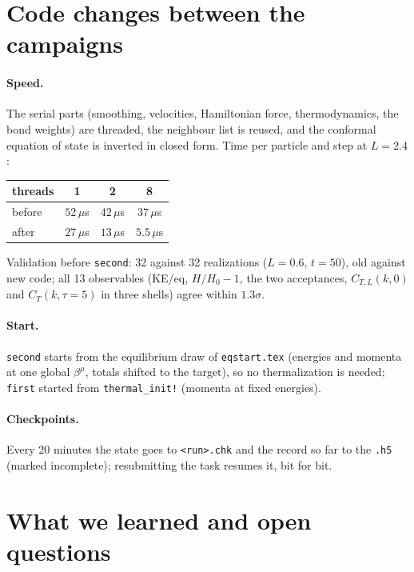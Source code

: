 \documentclass[11pt,aps,preprint,nofootinbib,superscriptaddress,tightenlines]{revtex4-2}
\let\oldparagraph\paragraph
\renewcommand{\paragraph}{\par\bigskip\oldparagraph}
\begin{document}
\section{Code changes between the campaigns}
\label{sec:code}

\paragraph{Speed.}  The serial parts (smoothing, velocities, Hamiltonian force,
thermodynamics, the bond weights) are threaded, the neighbour list is reused, and the
conformal equation of state is inverted in closed form.  Time per particle and step at
$L=2.4$:
\begin{center}
\begin{tabular}{lccc}
\hline
threads & 1 & 2 & 8 \\ \hline
before & $52\,\mu$s & $42\,\mu$s & $37\,\mu$s \\
after & $27\,\mu$s & $13\,\mu$s & $5.5\,\mu$s \\
\hline
\end{tabular}
\end{center}
Validation before \texttt{second}: 32 against 32 realizations ($L=0.6$, $t=50$), old against
new code; all 13 observables (KE/eq, $H/H_0-1$, the two acceptances, $C_{T,L}(k,0)$ and
$C_T(k,\tau=5)$ in three shells) agree within $1.3\sigma$.

\paragraph{Start.}  \texttt{second} starts from the equilibrium draw of
\texttt{eqstart.tex} (energies and momenta at one global $\beta^\mu$, totals shifted to the
target), so no thermalization is needed; \texttt{first} started from
\texttt{thermal\_init!} (momenta at fixed energies).

\paragraph{Checkpoints.}  Every 20 minutes the state goes to \texttt{<run>.chk} and the
record so far to the \texttt{.h5} (marked incomplete); resubmitting the task resumes it,
bit for bit.

\section{What we learned and open questions}
\label{sec:learned}
\end{document}
